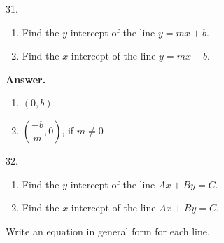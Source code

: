 \documentclass[10pt,]{book}
\theoremstyle{plain}
\theoremstyle{definition}
\theoremstyle{definition}
\theoremstyle{definition}
\numberwithin{equation}{part}
\begin{document}
\begin{exerciselist}
\begin{multicols}{2}
\begin{enumerate}[label=\alph*]
\end{enumerate}
\end{multicols}
\par\smallskip
\item[31.]\hypertarget{exercise-38}{}\leavevmode%
\begin{enumerate}[label=\alph*]
\item\hypertarget{li-218}{}Find the \(y\)-intercept of the line \(y = mx + b\).%
\item\hypertarget{li-219}{}Find the \(x\)-intercept of the line \(y = mx + b\).%
\end{enumerate}
%
\par\smallskip
\par\smallskip
\noindent\textbf{Answer.}\hypertarget{answer-23}{}\quad
\leavevmode%
\begin{enumerate}[label=\alph*]
\item\hypertarget{li-220}{}\((0, b)\)%
\item\hypertarget{li-221}{}\(\left(\dfrac{-b}{m},0\right)\), if \(m\ne 0\)%
\end{enumerate}
%
\item[32.]\hypertarget{exercise-39}{}\leavevmode%
\begin{enumerate}[label=\alph*]
\item\hypertarget{li-222}{}Find the \(y\)-intercept of the line \(Ax + By = C\).%
\item\hypertarget{li-223}{}Find the \(x\)-intercept of the line \(Ax + By = C\).%
\end{enumerate}
%
\par\smallskip
\end{exerciselist}
\hypertarget{exercisegroup-4}{}\par\noindent Write an equation in general form for each line.%
\end{document}
